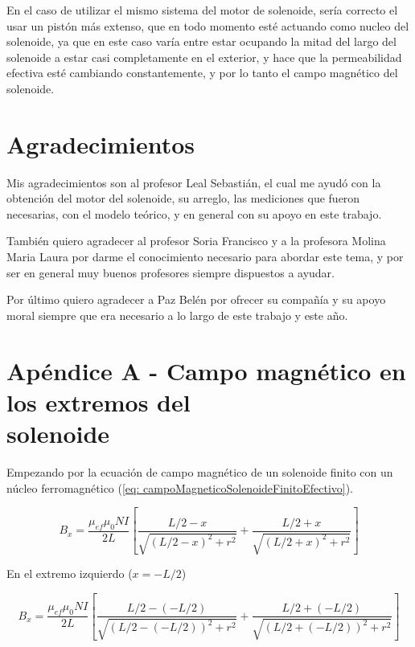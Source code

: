 \documentclass[a4paper,12pt]{article}
\begin{document}
        En el caso de utilizar el mismo sistema del motor de solenoide, sería correcto el usar un pistón más extenso, que en todo momento esté actuando como nucleo del solenoide, ya que en este caso varía entre estar ocupando la mitad del largo del solenoide a estar casi completamente en el exterior, y hace que la permeabilidad efectiva esté cambiando constantemente, y por lo tanto el campo magnético del solenoide.

\section*{Agradecimientos}

    Mis agradecimientos son al profesor Leal Sebastián, el cual me ayudó con la obtención del motor del solenoide, su arreglo, las mediciones que fueron necesarias, con el modelo teórico, y en general con su apoyo en este trabajo.

    También quiero agradecer al profesor Soria Francisco y a la profesora Molina Maria Laura por darme el conocimiento necesario para abordar este tema, y por ser en general muy buenos profesores siempre dispuestos a ayudar.

    Por último quiero agradecer a Paz Belén por ofrecer su compañía y su apoyo moral siempre que era necesario a lo largo de este trabajo y este año.

\section*{Apéndice A - Campo magnético en los extremos del \\solenoide}

Empezando por la ecuación de campo magnético de un solenoide finito con un núcleo ferromagnético (\ref{eq: campoMagneticoSolenoideFinitoEfectivo}).

    \begin{equation*}
        B_x = \frac{\mu_{ef}\mu_0 N I}{2L} \left[ \frac{L/2 - x}{\sqrt{(L/2 - x)^2 + r^2}} + \frac{L/2 + x}{\sqrt{(L/2 + x)^2 + r^2}} \right]
    \end{equation*}

    En el extremo izquierdo ($x=-L/2$)

    \begin{equation*}
        B_x = \frac{\mu_{ef}\mu_0 N I}{2L} \left[ \frac{L/2 - (-L/2)}{\sqrt{(L/2 - (-L/2))^2 + r^2}} + \frac{L/2 + (-L/2)}{\sqrt{(L/2 + (-L/2))^2 + r^2}} \right]
    \end{equation*}
\end{document}

